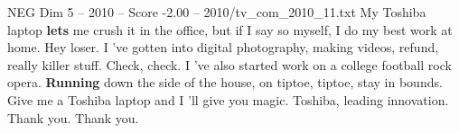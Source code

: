 \begin{textsample}{NEG Dim 5 – 2010 – Score -2.00 – 2010/tv\_com\_2010\_11.txt}  \label{ex:f5_neg_026}
My Toshiba laptop \textbf{lets} me crush it in the office, but if I say so myself, I do my best work at home.
Hey loser.
I 've gotten into digital photography, making videos, refund, really killer stuff.
Check, check.
I 've also started work on a college football rock opera. \textbf{Running} down the side of the house, on tiptoe, tiptoe, stay in bounds.
Give me a Toshiba laptop and I 'll give you magic.
Toshiba, leading innovation.
Thank you.
Thank you.

\end{textsample}
